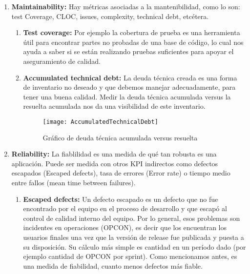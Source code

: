   \begin{enumerate}    

  \item {\textbf{Maintainability:} Hay métricas asociadas a la mantenibilidad, como lo son: test Coverage, CLOC, issues, complexity, technical debt, etcétera. 
  
    \begin{enumerate}    
    \item {\textbf{Test coverage:}
Por ejemplo la cobertura de prueba es una herramienta útil para encontrar partes no probadas de una base de código, lo cual nos ayuda a saber si se están realizando pruebas suficientes para apoyar el aseguramiento de calidad.
}
    \item {\textbf{Accumulated technical debt:}
La deuda técnica creada es una forma de inventario no deseado y que debemos manejar adecuadamente, para tener una buena calidad. Medir la deuda técnica acumulada versus la resuelta acumulada nos da una visibilidad de este inventario.
}

  \begin{figure}[h]
  \centering
  \texttt{[image: AccumulatedTechnicalDebt]}
  \caption{Gráfico de deuda técnica acumulada versus resuelta}
  \centering
  \label{fig:AccumulatedTechnicalDebt} %
  \end{figure}
  \FloatBarrier

  \end{enumerate}
}

  \item {\textbf{Reliability:} La fiablilidad es una medida de qué tan robusta es una aplicación. Puede ser medida con otros KPI indirectos como defectos escapados (Escaped defects), tasa de errores (Error rate) o tiempo medio entre fallos (mean time between failures).
  
  \begin{enumerate}    
    \item {\textbf{Escaped defects:}
Un defecto escapado es un defecto que no fue encontrado por el equipo en el proceso de desarrollo y que escapó al control de calidad interno del equipo. Por lo general, esos problemas son incidentes en operaciones (OPCON), es decir que los encuentran los usuarios finales una vez que la versión de release fue publicada y puesta a su disposición. Su cálculo más simple es cantidad en un período dado (por ejemplo cantidad de OPCON por sprint). Como mencionamos antes, es una medida de fiabilidad, cuanto menos defectos más fiable.
}
  \end{enumerate}
  }



\end{enumerate}
